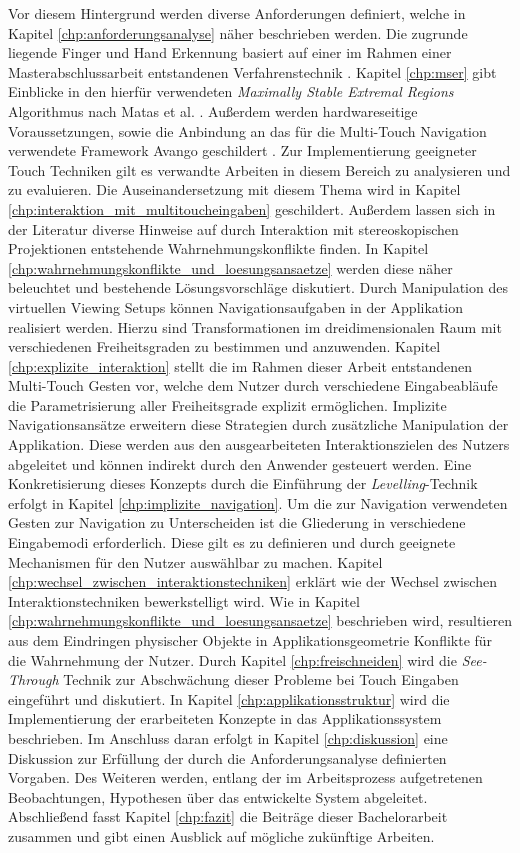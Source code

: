 Vor diesem Hintergrund werden diverse Anforderungen definiert, welche in Kapitel \ref{chp:anforderungsanalyse} näher beschrieben werden. Die zugrunde liegende Finger und Hand Erkennung basiert auf einer im Rahmen einer Masterabschlussarbeit entstandenen Verfahrenstechnik \cite{ewerling:2012}. Kapitel \ref{chp:mser} gibt Einblicke in den hierfür verwendeten \emph{Maximally Stable Extremal Regions} Algorithmus nach Matas et al. \cite{matas:2004}. Außerdem werden hardwareseitige Voraussetzungen, sowie die Anbindung an das für die Multi-Touch Navigation verwendete Framework Avango geschildert \cite{avango:2011}. Zur Implementierung geeigneter Touch Techniken gilt es verwandte Arbeiten in diesem Bereich zu analysieren und zu evaluieren. Die Auseinandersetzung mit diesem Thema wird in Kapitel \ref{chp:interaktion_mit_multitoucheingaben} geschildert. Außerdem lassen sich in der Literatur diverse Hinweise auf durch Interaktion mit stereoskopischen Projektionen entstehende Wahrnehmungskonflikte finden. In Kapitel \ref{chp:wahrnehmungskonflikte_und_loesungsansaetze} werden diese näher beleuchtet und bestehende Lösungsvorschläge diskutiert. Durch Manipulation des virtuellen Viewing Setups können Navigationsaufgaben in der Applikation realisiert werden. Hierzu sind Transformationen im dreidimensionalen Raum mit verschiedenen Freiheitsgraden zu bestimmen und anzuwenden. Kapitel \ref{chp:explizite_interaktion} stellt die im Rahmen dieser Arbeit entstandenen Multi-Touch Gesten vor, welche dem Nutzer durch verschiedene Eingabeabläufe die Parametrisierung aller Freiheitsgrade explizit ermöglichen. Implizite Navigationsansätze erweitern diese Strategien durch zusätzliche Manipulation der Applikation. Diese werden aus den ausgearbeiteten Interaktionszielen des Nutzers abgeleitet und können indirekt durch den Anwender gesteuert werden. Eine Konkretisierung dieses Konzepts durch die Einführung der \emph{Levelling}-Technik erfolgt in Kapitel \ref{chp:implizite_navigation}. Um die zur Navigation verwendeten Gesten zur Navigation zu Unterscheiden ist die Gliederung in verschiedene Eingabemodi erforderlich. Diese gilt es zu definieren und durch geeignete Mechanismen für den Nutzer auswählbar zu machen. Kapitel \ref{chp:wechsel_zwischen_interaktionstechniken} erklärt wie der Wechsel zwischen Interaktionstechniken bewerkstelligt wird. Wie in Kapitel \ref{chp:wahrnehmungskonflikte_und_loesungsansaetze} beschrieben wird, resultieren aus dem Eindringen physischer Objekte in Applikationsgeometrie Konflikte für die Wahrnehmung der Nutzer. Durch Kapitel \ref{chp:freischneiden} wird die \emph{See-Through} Technik zur Abschwächung dieser Probleme bei Touch Eingaben eingeführt und diskutiert. In Kapitel \ref{chp:applikationsstruktur} wird die Implementierung der erarbeiteten Konzepte in das Applikationssystem beschrieben. Im Anschluss daran erfolgt in Kapitel \ref{chp:diskussion} eine Diskussion zur Erfüllung der durch die Anforderungsanalyse definierten Vorgaben. Des Weiteren werden, entlang der im Arbeitsprozess aufgetretenen Beobachtungen, Hypothesen über das entwickelte System abgeleitet. Abschließend fasst Kapitel \ref{chp:fazit} die Beiträge dieser Bachelorarbeit zusammen und gibt einen Ausblick auf mögliche zukünftige Arbeiten.